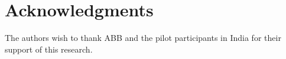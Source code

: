 \documentclass{sig-alternate}
\begin{document}
\section{Acknowledgments}
The authors wish to thank ABB and the pilot participants in India for their support of this research.

%

\balance
 
%
%
\end{document}
